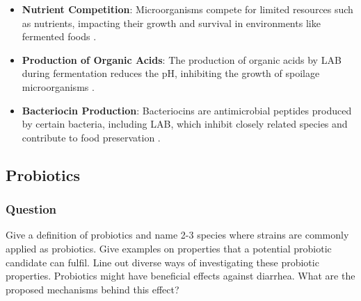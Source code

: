 \begin{itemize}
    \item \textbf{Nutrient Competition}: Microorganisms compete for limited resources such as nutrients, impacting their growth and survival in environments like fermented foods \cite*{L8-ImpQuorum}.
    \item \textbf{Production of Organic Acids}: The production of organic acids by LAB during fermentation reduces the pH, inhibiting the growth of spoilage microorganisms \cite*{L8-ImpQuorum}.
    \item \textbf{Bacteriocin Production}: Bacteriocins are antimicrobial peptides produced by certain bacteria, including LAB, which inhibit closely related species and contribute to food preservation \cite*{L8-ImpQuorum}.
\end{itemize}

\subsection{Probiotics}
\subsubsection*{Question}
Give a definition of probiotics and name 2-3 species where strains are commonly applied as probiotics. Give examples on properties that a potential probiotic candidate can fulfil. Line out diverse ways of investigating these probiotic properties. Probiotics might have beneficial effects against diarrhea. What are the proposed mechanisms behind this effect?

